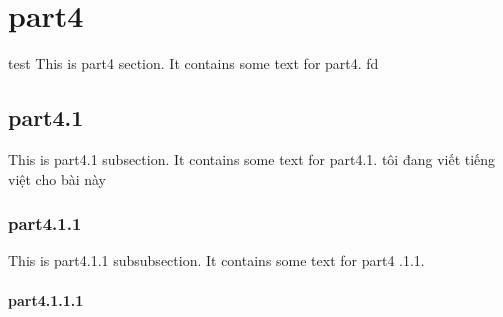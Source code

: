 \section{part4} 
test
This is part4 section. It contains some text for part4.    
fd 
\subsection{part4.1}
This is part4.1 subsection. It contains some text for part4.1. tôi đang viết tiếng việt cho bài này
\subsubsection{part4.1.1}
This is part4.1.1 subsubsection. It contains some text for part4
.1.1.
\paragraph{part4.1.1.1}